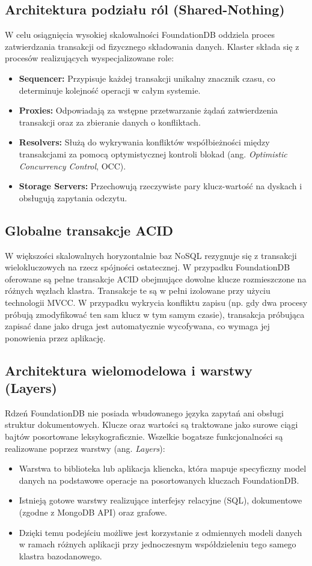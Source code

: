 \subsection{Architektura podziału ról (Shared-Nothing)}
W celu osiągnięcia wysokiej skalowalności FoundationDB oddziela proces zatwierdzania transakcji od fizycznego składowania danych. Klaster składa się z procesów realizujących wyspecjalizowane role:
\begin{itemize}
    \item \textbf{Sequencer:} Przypisuje każdej transakcji unikalny znacznik czasu, co determinuje kolejność operacji w całym systemie.
    \item \textbf{Proxies:} Odpowiadają za wstępne przetwarzanie żądań zatwierdzenia transakcji oraz za zbieranie danych o konfliktach.
    \item \textbf{Resolvers:} Służą do wykrywania konfliktów współbieżności między transakcjami za pomocą optymistycznej kontroli blokad (ang. \emph{Optimistic Concurrency Control}, OCC).
    \item \textbf{Storage Servers:} Przechowują rzeczywiste pary klucz-wartość na dyskach i obsługują zapytania odczytu.
\end{itemize}

\subsection{Globalne transakcje ACID}
W większości skalowalnych horyzontalnie baz NoSQL rezygnuje się z transakcji wielokluczowych na rzecz spójności ostatecznej. W przypadku FoundationDB oferowane są pełne transakcje ACID obejmujące dowolne klucze rozmieszczone na różnych węzłach klastra. Transakcje te są w pełni izolowane przy użyciu technologii MVCC. W przypadku wykrycia konfliktu zapisu (np. gdy dwa procesy próbują zmodyfikować ten sam klucz w tym samym czasie), transakcja próbująca zapisać dane jako druga jest automatycznie wycofywana, co wymaga jej ponowienia przez aplikację.

\subsection{Architektura wielomodelowa i warstwy (Layers)}
Rdzeń FoundationDB nie posiada wbudowanego języka zapytań ani obsługi struktur dokumentowych. Klucze oraz wartości są traktowane jako surowe ciągi bajtów posortowane leksykograficznie. Wszelkie bogatsze funkcjonalności są realizowane poprzez warstwy (ang. \emph{Layers}):
\begin{itemize}
    \item Warstwa to biblioteka lub aplikacja kliencka, która mapuje specyficzny model danych na podstawowe operacje na posortowanych kluczach FoundationDB.
    \item Istnieją gotowe warstwy realizujące interfejsy relacyjne (SQL), dokumentowe (zgodne z MongoDB API) oraz grafowe.
    \item Dzięki temu podejściu możliwe jest korzystanie z odmiennych modeli danych w ramach różnych aplikacji przy jednoczesnym współdzieleniu tego samego klastra bazodanowego.
\end{itemize}

